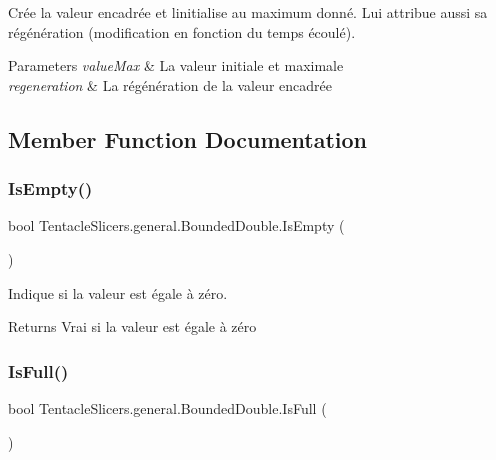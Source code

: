 Crée la valeur encadrée et l\textquotesingle{}initialise au maximum donné. Lui attribue aussi sa régénération (modification en fonction du temps écoulé). 


\begin{DoxyParams}{Parameters}
{\em value\+Max} & La valeur initiale et maximale \\
\hline
{\em regeneration} & La régénération de la valeur encadrée \\
\hline
\end{DoxyParams}


\subsection{Member Function Documentation}
\mbox{\label{class_tentacle_slicers_1_1general_1_1_bounded_double_abcc7a3b553b3c4744925510564e79a71}} 
\subsubsection{\texorpdfstring{Is\+Empty()}{IsEmpty()}}
{\footnotesize\ttfamily bool Tentacle\+Slicers.\+general.\+Bounded\+Double.\+Is\+Empty (\begin{DoxyParamCaption}{ }\end{DoxyParamCaption})}



Indique si la valeur est égale à zéro. 

\begin{DoxyReturn}{Returns}
Vrai si la valeur est égale à zéro 
\end{DoxyReturn}
\mbox{\label{class_tentacle_slicers_1_1general_1_1_bounded_double_ae0119b85bb355e2a13431360fc90c186}} 
\subsubsection{\texorpdfstring{Is\+Full()}{IsFull()}}
{\footnotesize\ttfamily bool Tentacle\+Slicers.\+general.\+Bounded\+Double.\+Is\+Full (\begin{DoxyParamCaption}{ }\end{DoxyParamCaption})}



